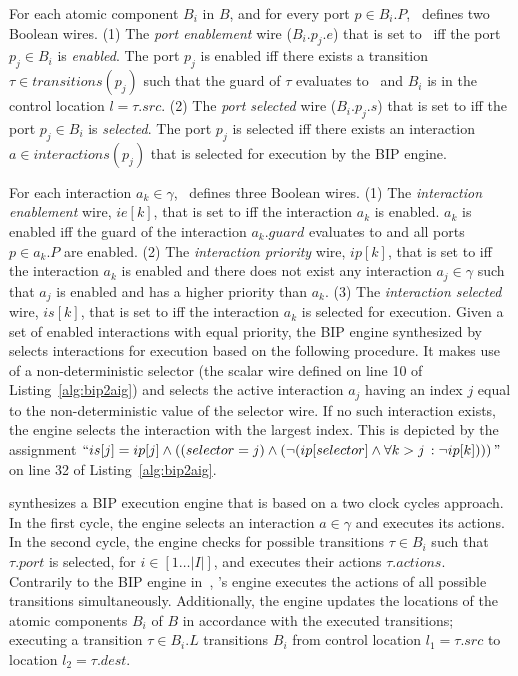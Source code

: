 For each atomic component $B_i$ in $B$, and for every port $p \in B_i.P$, 
\biptool~defines two Boolean wires. 
(1) The {\em port enablement} wire ($B_i.p_j.e$) that is set to \true~iff the port $p_j \in B_i$ is 
{\em enabled}. The port $p_j$ is enabled iff there exists a transition $\tau \in transitions(p_j)$
such that the guard of $\tau$ evaluates to \true~and $B_i$ is in the control location $l = \tau.src$.
(2) The {\em port selected} wire ($B_i.p_j.s$) that is set to \true{} iff the port $p_j \in B_i$ is
{\em selected}. The port $p_j$ is selected iff there exists an interaction $a \in interactions(p_j)$
that is selected for execution by the BIP engine.

For each interaction $a_k \in \gamma$, \biptool~defines three Boolean wires. 
(1) The {\em interaction enablement} wire, $ie[k]$, that is set to \true{} iff the interaction
$a_k$ is enabled. $a_k$ is enabled iff the guard of the interaction $a_k.guard$ evaluates
to \true{} and all ports $p \in a_k.P$ are enabled. 
(2) The {\em interaction priority} wire, $ip[k]$, that is set to \true{} iff the interaction 
$a_k$ is enabled and there does not exist any interaction $a_j \in \gamma$ such that 
$a_j$ is enabled and has a higher priority than $a_k$.
(3) The {\em interaction selected} wire, $is[k]$, that is set to \true{} iff the
interaction $a_k$ is selected for execution. Given a set of enabled interactions 
with equal priority, the BIP engine synthesized by \biptool{}
selects interactions for execution based on the following procedure. It makes use of a
non-deterministic selector (the  scalar wire defined on line 10 
of Listing~\ref{alg:bip2aig}) and selects the active interaction $a_j$ having 
an index $j$ equal to the non-deterministic value of the selector wire.
If no such interaction exists, the engine selects the interaction with the largest 
index. 
This is depicted by the assignment $``is[j] = ip[j] \land \left( (selector = j) 
\land (\lnot (ip[selector] \land \forall{k > j}\,:\lnot ip[k])) \right)"$ on line 32 of Listing~\ref{alg:bip2aig}.

\biptool{} synthesizes a BIP execution engine that is based on a two clock cycles 
approach. In the first cycle, the engine selects an interaction $a \in \gamma$ 
and executes its actions. In the second cycle, the engine checks for possible
transitions $\tau \in B_i$ such that $\tau.port$ is selected, for $i \in [1\ldots|I|]$,
and executes their actions $\tau.actions$. Contrarily to the BIP engine in~\cite{BasuBBCJNS11},
\biptool's engine executes the actions of all possible transitions simultaneously.
Additionally, the engine updates the locations of the atomic components $B_i$ of $B$
in accordance with the executed transitions; \ie{} executing a transition $\tau \in B_i.L$ 
transitions $B_i$ from control location $l_1 = \tau.src$ to location $l_2 = \tau.dest$.

